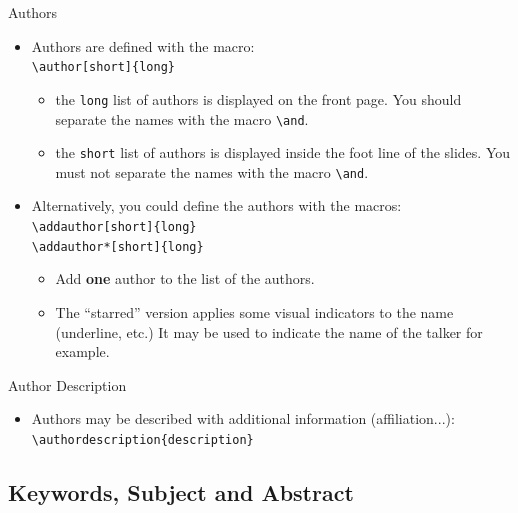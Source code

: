 \documentclass[english,sectioncirclenumberstyle]{ciadbeamer}
\begin{document}
\begin{frame}{Authors}
	\begin{itemize}
	\item Authors are defined with the macro: \\
		\texttt{{\textbackslash}author[short]\{long\}}
		\begin{itemize}
		\item the \texttt{long} list of authors is displayed on the front page. You should separate the names with the macro \texttt{{\textbackslash}and}.
		\item the \texttt{short} list of authors is displayed inside the foot line of the slides. You \alert{must not separate} the names with the macro \texttt{{\textbackslash}and}.
		\end{itemize}
	\vfill
	\item \alert{Alternatively}, you could define the authors with the macros: \\
		\texttt{{\textbackslash}addauthor[short]\{long\}} \\
		\texttt{{\textbackslash}addauthor*[short]\{long\}}
		\begin{itemize}
		\item Add \textbf{one} author to the list of the authors.
		\item The ``starred'' version applies some visual indicators to the name (underline, etc.) It may be used to indicate the name of the talker for example.
		\end{itemize}
	\end{itemize}
	\vfill
\end{frame}

\begin{frame}{Author Description}
	\begin{itemize}
	\item Authors may be described with additional information (affiliation...): \\
		\texttt{{\textbackslash}authordescription\{description\}}
	\end{itemize}
	\vfill
\end{frame}

\subsection{Keywords, Subject and Abstract}
\end{document}
